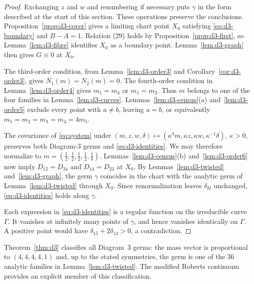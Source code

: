 \documentclass[Threeside,11pt]{article}
\theoremstyle{definition}
\theoremstyle{remark}
\numberwithin{equation}{section}
\theoremstyle{remark}
\begin{document}
\begin{proof}
{Exchanging $z$ and $w$ and renumbering if necessary puts $\gamma$ in the form
described at the start of this section. These operations preserve the conclusions.
Proposition~\ref{prop:d3-cover} gives a limiting chart point $X_0$ satisfying
\eqref{eq:d3-boundary} and $B-A=1$. Relation (29) holds by Proposition~\ref{prop:d3-first},
so Lemma~\ref{lem:d3-fibre} identifies $X_0$ as a boundary point. Lemma~\ref{lem:d3-graph} then gives
$G\equiv0$ at $X_0$.

The third-order condition, from Lemma~\ref{lem:d3-order3} and
Corollary~\ref{cor:d3-order3}, gives $N_1(m)=N_2(m)=0$.
The fourth-order condition in Lemma~\ref{lem:d3-order4} gives $m_1=m_4$ or $m_1=m_2$.
Thus $m$ belongs to one of the four families in Lemma~\ref{lem:d3-curves}.
Lemmas~\ref{lem:d3-census}(a) and~\ref{lem:d3-order5} exclude every point with $a\ne b$,
leaving $a=b$, or equivalently $m_1=m_2=m_3=m_4=4m_5$.

The covariance of \eqref{eq:system} under
$(m,z,w,\delta)\mapsto(\kappa^3m,\kappa z,\kappa w,\kappa^{-1}\delta)$, $\kappa>0$,
preserves both Diagram-3 germs and \eqref{eq:d3-identities}.
We may therefore normalize to $m=(\frac12,\frac12,\frac12,\frac12,\frac18)$.
Lemmas~\ref{lem:d3-census}(b) and~\ref{lem:d3-order6} now imply $D_{12}=D_{34}$ and
$D_{14}=D_{23}$ at $X_0$.
By Lemmas~\ref{lem:d3-twisted} and~\ref{lem:d3-graph}, the germ $\gamma$ coincides in the chart
with the analytic germ of Lemma~\ref{lem:d3-twisted} through $X_0$. Since renormalization leaves $\delta_{kl}$ unchanged,
\eqref{eq:d3-identities} holds along $\gamma$.

Each expression in \eqref{eq:d3-identities} is a regular function on the irreducible curve
$\Gamma$. It vanishes at infinitely many points of $\gamma$, and hence vanishes identically
on $\Gamma$. A positive point would have $\delta_{15}+2\delta_{13}>0$, a contradiction.}
\end{proof}

{Theorem~\ref{thm:d3} classifies all Diagram~3 germs: the mass vector is
proportional to $(4,4,4,4,1)$ and, up to the stated symmetries, the germ is one of the
$36$ analytic families in Lemma~\ref{lem:d3-twisted}. The modified Roberts continuum
provides an explicit member of this classification.}
\end{document}

